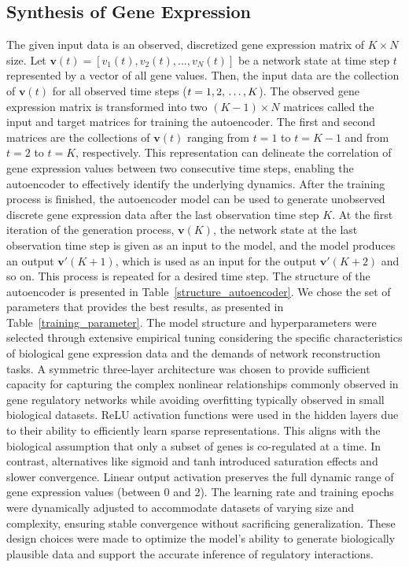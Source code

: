 \subsection{Synthesis of Gene Expression}
The given input data is an observed, discretized gene expression matrix of \(K \times N\) size. Let \(\textbf{v}(t) = [v_1(t), v_2(t),...,v_N(t)]\) be a network state at time step \(t\) represented by a vector of all gene values. Then, the input data are the collection of \(\textbf{v}(t)\) for all observed time steps (\(t=1, 2,~$\dots$, K\)). The observed gene expression matrix is transformed into two \((K-1) \times N\) matrices called the input and target matrices for training the autoencoder. The first and second matrices are the collections of \(\textbf{v}(t)\) ranging from \(t=1\) to \(t=K-1\) and from \(t=2\) to \(t=K\), respectively. This representation can delineate the correlation of gene expression values between two consecutive time steps, enabling the autoencoder to effectively identify the underlying dynamics. After the training process is finished, the autoencoder model can be used to generate unobserved discrete gene expression data after the last observation time step \(K\). At the first iteration of the generation process, \(\textbf{v}(K)\), the network state at the last observation time step is given as an input to the model, and the model produces an output \(\textbf{v$'$}(K+1)\), which is used as an input for the output \(\textbf{v$'$}(K+2)\) and so on. This process is repeated for a desired time step. The structure of the autoencoder is presented in Table~\ref{structure_autoencoder}. We chose the set of parameters that provides the best results, as presented in Table~\ref{training_parameter}. {The model structure and hyperparameters were selected through extensive empirical tuning considering the specific characteristics of biological gene expression data and the demands of network reconstruction tasks. A symmetric three-layer architecture was chosen to provide sufficient capacity for capturing the complex nonlinear relationships commonly observed in gene regulatory networks while avoiding overfitting typically observed in small biological datasets. ReLU activation functions were used in the hidden layers due to their ability to efficiently learn sparse representations. This aligns with the biological assumption that only a subset of genes is co-regulated at a time. In contrast, alternatives like sigmoid and tanh introduced saturation effects and slower convergence. Linear output activation preserves the full dynamic range of gene expression values (between 0 and 2). The learning rate and training epochs were dynamically adjusted to accommodate datasets of varying size and complexity, ensuring stable convergence without sacrificing generalization. These design choices were made to optimize the model’s ability to generate biologically plausible data and support the accurate inference of regulatory interactions.}

